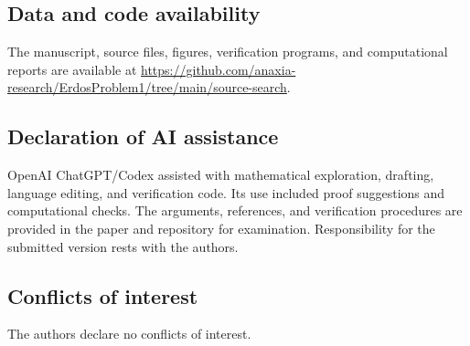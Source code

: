 \documentclass[11pt,a4paper]{amsart}
\theoremstyle{definition}\newtheorem{definition}[theorem]{Definition}
\begin{document}
\subsection*{Data and code availability}
The manuscript, source files, figures, verification programs,
and computational reports are available at
\url{https://github.com/anaxia-research/ErdosProblem1/tree/main/source-search}.

\subsection*{Declaration of AI assistance}
OpenAI ChatGPT/Codex assisted with mathematical exploration,
drafting, language editing, and verification code.
Its use included proof suggestions and computational checks.
The arguments, references, and verification procedures are
provided in the paper and repository for examination.
Responsibility for the submitted version rests with the authors.

\subsection*{Conflicts of interest}
The authors declare no conflicts of interest.
\end{document}

